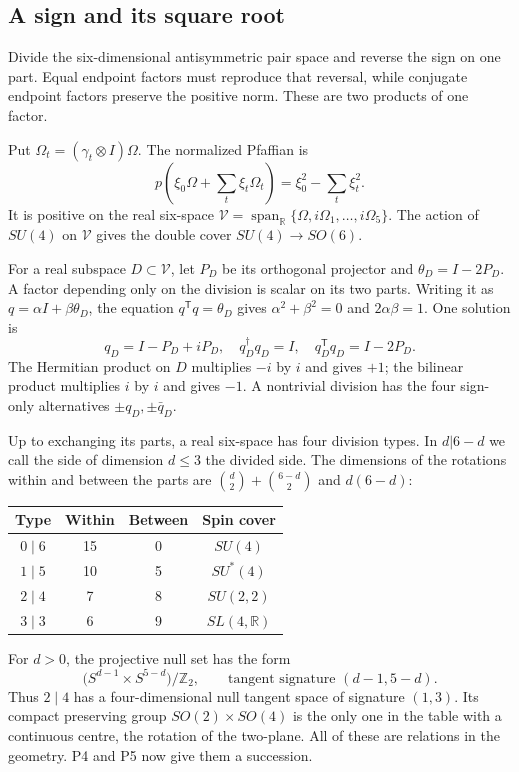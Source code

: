 \documentclass[aps,prx,reprint,longbibliography]{revtex4-2}
\providecommand{\R}{\mathbb R}
\begin{document}
\subsection{A sign and its square root}

Divide the six-dimensional antisymmetric pair space and reverse the sign on one part. Equal endpoint factors must reproduce that reversal, while conjugate endpoint factors preserve the positive norm. These are two products of one factor.

Put $\Omega_t=(\gamma_t\otimes I)\Omega$. The normalized Pfaffian is
\begin{equation}
 p\!\left(\xi_0\Omega+\sum_t \xi_t\Omega_t\right)
 =\xi_0^2-\sum_t \xi_t^2.
 \label{eq:pfaffian}
\end{equation}
It is positive on the real six-space
$\mathscr V=\operatorname{span}_{\R}\{\Omega,i\Omega_1,\ldots,i\Omega_5\}$.
The action of $SU(4)$ on $\mathscr V$ gives the double cover $SU(4)\to SO(6)$.

For a real subspace $D\subset\mathscr V$, let $P_D$ be its orthogonal projector and $\theta_D=I-2P_D$. A factor depending only on the division is scalar on its two parts. Writing it as $q=\alpha I+\beta\theta_D$, the equation $q^{\mathsf T}q=\theta_D$ gives $\alpha^2+\beta^2=0$ and $2\alpha\beta=1$. One solution is
\begin{equation}
 q_D=I-P_D+iP_D,\quad
 q_D^\dagger q_D=I,\quad q_D^{\mathsf T}q_D=I-2P_D.
 \label{eq:half}
\end{equation}
The Hermitian product on $D$ multiplies $-i$ by $i$ and gives $+1$; the bilinear product multiplies $i$ by $i$ and gives $-1$. A nontrivial division has the four sign-only alternatives $\pm q_D,\pm\bar q_D$.

Up to exchanging its parts, a real six-space has four division types. In $d|6-d$ we call the side of dimension $d\leq3$ the divided side. The dimensions of the rotations within and between the parts are $\binom d2+\binom{6-d}2$ and $d(6-d)$:
\begin{center}\small
\begin{tabular}{@{}cccc@{}}
\toprule
Type&Within&Between&Spin cover\\\midrule
$0\mid6$&15&0&$SU(4)$\\
$1\mid5$&10&5&$SU^*(4)$\\
$2\mid4$&7&8&$SU(2,2)$\\
$3\mid3$&6&9&$SL(4,\R)$\\\bottomrule
\end{tabular}
\end{center}
For $d>0$, the projective null set has the form
\begin{equation}
 \bigl(S^{d-1}\times S^{5-d}\bigr)/\mathbb Z_2,
 \qquad\text{tangent signature }(d-1,5-d).
 \label{eq:nullspace}
\end{equation}
Thus $2\mid4$ has a four-dimensional null tangent space of signature $(1,3)$. Its compact preserving group $SO(2)\times SO(4)$ is the only one in the table with a continuous centre, the rotation of the two-plane. All of these are relations in the geometry. P4 and P5 now give them a succession.
\end{document}
